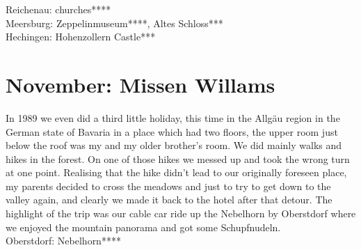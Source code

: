 Reichenau: churches****\\
Meersburg: Zeppelinmuseum****, Altes Schloss***\\
Hechingen: Hohenzollern Castle***

\section{November: Missen Willams}
\label{1989:MissenWillams}

In 1989 we even did a third little holiday, this time in the Allg\"au region in the German state of Bavaria in a place which had two floors, the upper room just below the roof was my and my older brother's room. We did mainly walks and hikes in the forest. On one of those hikes we messed up and took the wrong turn at one point. Realising that the hike didn't lead to our originally foreseen place, my parents decided to cross the meadows and just to try to get down to the valley again, and clearly we made it back to the hotel after that detour. The highlight of the trip was our cable car ride up the Nebelhorn by Oberstdorf where we enjoyed the mountain panorama and got some Schupfnudeln.\\

Oberstdorf: Nebelhorn****